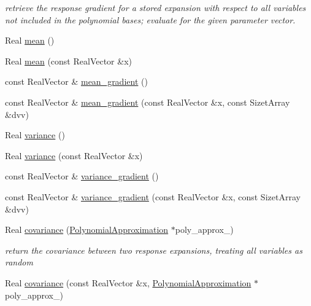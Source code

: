 \begin{DoxyCompactItemize}
\begin{DoxyCompactList}\small\item\em retrieve the response gradient for a stored expansion with respect to all variables not included in the polynomial bases; evaluate for the given parameter vector. \end{DoxyCompactList}\item 
Real \hyperlink{classPecos_1_1OrthogPolyApproximation_adc6f262952d05a33ff68cae37929cbb2}{mean} ()
\item 
Real \hyperlink{classPecos_1_1OrthogPolyApproximation_aed107df248a4555c052446fbc10a8e61}{mean} (const Real\+Vector \&x)
\item 
const Real\+Vector \& \hyperlink{classPecos_1_1OrthogPolyApproximation_a069c87a26fdb4b09af68db26abd646a0}{mean\+\_\+gradient} ()
\item 
const Real\+Vector \& \hyperlink{classPecos_1_1OrthogPolyApproximation_a24f2edc21c9887121cda78faae1c1475}{mean\+\_\+gradient} (const Real\+Vector \&x, const Sizet\+Array \&dvv)
\item 
Real \hyperlink{classPecos_1_1OrthogPolyApproximation_a38f6da77468be17e02ce38af2c0976c3}{variance} ()
\item 
Real \hyperlink{classPecos_1_1OrthogPolyApproximation_acbdcb523a161d7d3a5cc190796e84ede}{variance} (const Real\+Vector \&x)
\item 
const Real\+Vector \& \hyperlink{classPecos_1_1OrthogPolyApproximation_ae898fc2f42f1077268f89fc2e9f2c71c}{variance\+\_\+gradient} ()
\item 
const Real\+Vector \& \hyperlink{classPecos_1_1OrthogPolyApproximation_a791e127a445f8a6c9c3a7966d12c1431}{variance\+\_\+gradient} (const Real\+Vector \&x, const Sizet\+Array \&dvv)
\item 
Real \hyperlink{classPecos_1_1OrthogPolyApproximation_ac0085912d4abb9caa3f480b9c6778c0e}{covariance} (\hyperlink{classPecos_1_1PolynomialApproximation}{Polynomial\+Approximation} $\ast$poly\+\_\+approx\+\_)\label{classPecos_1_1OrthogPolyApproximation_ac0085912d4abb9caa3f480b9c6778c0e}

\begin{DoxyCompactList}\small\item\em return the covariance between two response expansions, treating all variables as random \end{DoxyCompactList}\item 
Real \hyperlink{classPecos_1_1OrthogPolyApproximation_afc1731a3d89818d49c03a3c20a7a2898}{covariance} (const Real\+Vector \&x, \hyperlink{classPecos_1_1PolynomialApproximation}{Polynomial\+Approximation} $\ast$poly\+\_\+approx\+\_)\label{classPecos_1_1OrthogPolyApproximation_afc1731a3d89818d49c03a3c20a7a2898}


\end{DoxyCompactItemize}
